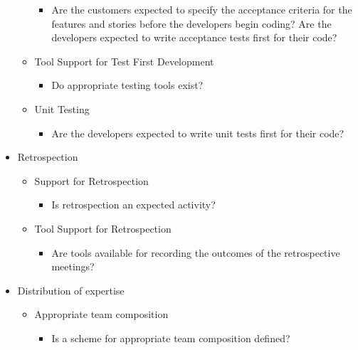 \begin{itemize}
\begin{itemize}
\begin{itemize}
					\item Are the customers expected to specify the acceptance criteria for the features and stories before the developers begin coding?
					\addition Are the developers expected to write acceptance tests first for their code?
				\end{itemize}
		\end{itemize} 
		\begin{itemize}
			\item Tool Support for Test First Development
				\begin{itemize}
					\item Do appropriate testing tools exist?
				\end{itemize}
		\end{itemize}
		\begin{itemize}
			\item Unit Testing
				\begin{itemize}
					\item Are the developers expected to write unit tests first for their code?
				\end{itemize}
		\end{itemize}
	\item Retrospection
		\begin{itemize}
			\item Support for Retrospection
				\begin{itemize}
					\item Is retrospection an expected activity?
				\end{itemize}
		\end{itemize}
		\begin{itemize}
			\item Tool Support for Retrospection
				\begin{itemize}
					\item Are tools available for recording the outcomes of the retrospective meetings?
				\end{itemize}
		\end{itemize}
	\item Distribution of expertise
		\begin{itemize}
			\item Appropriate team composition
				\begin{itemize}
					\item Is a scheme for appropriate team composition defined?

\end{itemize}
\end{itemize}
\end{itemize}
